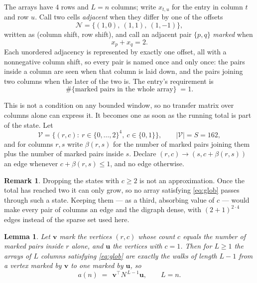 \documentclass[11pt,a4paper]{article}
\theoremstyle{plain}
\newtheorem{lemma}[theorem]{Lemma}
\theoremstyle{definition}
\newtheorem{remark}[theorem]{Remark}
\begin{document}
The arrays have $4$ rows and $L=n$ columns; write $x_{t,u}$ for the entry in
column $t$ and row $u$. Call two cells \emph{adjacent} when they differ by one of the
offsets
\[
\mathcal N=\{(1,0),\ (1,1),\ (1,-1)\},
\]
written as (column shift, row shift), and call an adjacent pair $\{p,q\}$
\emph{marked} when
\[
x_{p}+x_{q}=2 .
\]
Each unordered adjacency is represented by exactly one offset, all with a nonnegative column
shift, so every pair is named once and only once: the pairs inside a column are seen when
that column is laid down, and the pairs joining two columns when the later of the two is. The
entry's requirement is
\begin{equation}\label{eq:glob}
\#\{\text{marked pairs in the whole array}\}\;=1.
\end{equation}

This is not a condition on any bounded window, so no transfer matrix over columns alone can
express it. It becomes one as soon as the running total is part of the state. Let
\[
\mathcal V=\bigl\{(r,c):\ r\in\{0,\dots,2\}^{4},\ c\in\{0,1\}\bigr\},
\qquad |\mathcal V|=S=162,
\]
and for columns $r,s$ write $\beta(r,s)$ for the number of marked pairs joining them plus the
number of marked pairs inside $s$. Declare $(r,c)\to(s,c+\beta(r,s))$ an edge whenever
$c+\beta(r,s)\le1$, and no edge otherwise.

\begin{remark}
Dropping the states with $c\ge2$ is not an approximation. Once the total has reached two it
can only grow, so no array satisfying \eqref{eq:glob} passes through such a state. Keeping
them --- as a third, absorbing value of $c$ --- would make every pair of columns an edge and
the digraph dense, with $(2+1)^{2\cdot4}$ edges instead of the sparse set used here.
\end{remark}

\begin{lemma}\label{lem:walk}
Let $\mathbf{v}$ mark the vertices $(r,c)$ whose count $c$ equals the number of marked pairs
inside $r$ alone, and $\mathbf{u}$ the vertices with $c=1$. Then for $L\ge1$ the arrays
of $L$ columns satisfying \eqref{eq:glob} are exactly the walks of length $L-1$ from a
vertex marked by $\mathbf{v}$ to one marked by $\mathbf{u}$, so
\[
a(n)\;=\;\,\mathbf{v}^{\!\top}N^{\,L-1}\mathbf{u},\qquad L=n .
\]
\end{lemma}
\end{document}
